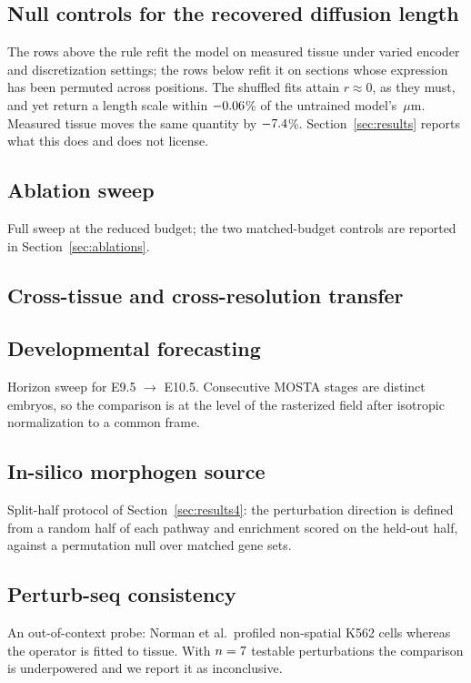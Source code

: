 
\subsection{Null controls for the recovered diffusion length}

The rows above the rule refit the model on measured tissue under varied
encoder and discretization settings; the rows below refit it on sections whose
expression has been permuted across positions. The shuffled fits attain
$r \approx 0$, as they must, and yet return a length scale within
$-0.06$\% of the untrained model's \NullInit\,$\mu$m. Measured
tissue moves the same quantity by $-7.4$\%. Section~\ref{sec:results}
reports what this does and does not license.

\subsection{Ablation sweep}
Full sweep at the reduced budget; the two matched-budget controls are reported in
Section~\ref{sec:ablations}.

\subsection{Cross-tissue and cross-resolution transfer}

\subsection{Developmental forecasting}
Horizon sweep for E9.5 $\rightarrow$ E10.5. Consecutive MOSTA stages are distinct
embryos, so the comparison is at the level of the rasterized field after
isotropic normalization to a common frame.

\subsection{In-silico morphogen source}
Split-half protocol of Section~\ref{sec:results4}: the perturbation direction is
defined from a random half of each pathway and enrichment scored on the held-out
half, against a permutation null over matched gene sets.

\subsection{Perturb-seq consistency}
An out-of-context probe: Norman et al.\ profiled non-spatial K562 cells whereas
the operator is fitted to tissue. With $n=7$ testable perturbations the
comparison is underpowered and we report it as inconclusive.

